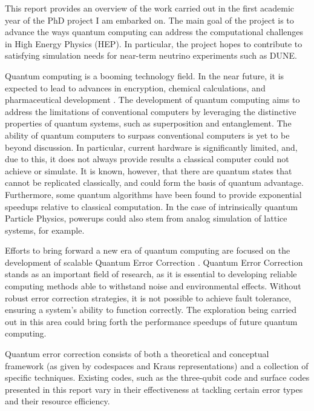 

This report provides an overview of the work carried out in the first academic year of the PhD project I am embarked on. The main goal of the project is to advance the ways quantum computing can address the computational challenges in High Energy Physics (HEP). In particular, the project hopes to contribute to satisfying simulation needs for near-term neutrino experiments such as DUNE.

Quantum computing is a booming technology field. In the near future, it is expected to lead to advances in encryption, chemical calculations, and pharmaceutical development \cite{Bova2021,Urbanek2020}. The development of quantum computing aims to address the limitations of conventional computers by leveraging the distinctive properties of quantum systems, such as superposition and entanglement. The ability of quantum computers to surpass conventional computers is yet to be beyond discussion. In particular, current hardware is significantly limited, and, due to this, it does not always provide results a classical computer could not achieve or simulate. It is known, however, that there are quantum states that cannot be replicated classically, and could form the basis of quantum advantage\cite{Oliviero2022,Zhang2024}. Furthermore, some quantum algorithms have been found to provide exponential speedups relative to classical computation. In the case of intrinsically quantum Particle Physics, powerups could also stem from analog simulation of lattice systems, for example\cite{Humble2022}.

Efforts to bring forward a new era of quantum computing are focused on the development of scalable Quantum Error Correction \cite{Girvin2021,Devitt2013,Roffe2019}. Quantum Error Correction stands as an important field of research, as it is essential to developing reliable computing methods able to withstand noise and environmental effects. Without robust error correction strategies, it is not possible to achieve fault tolerance, ensuring a system's ability to function correctly. The exploration being carried out in this area could bring forth the performance speedups of future quantum computing.

Quantum error correction consists of both a theoretical and conceptual framework (as given by codespaces and Kraus representations) and a collection of specific techniques. Existing codes, such as the three-qubit code and surface codes presented in this report vary in their effectiveness at tackling certain error types and their resource efficiency.


